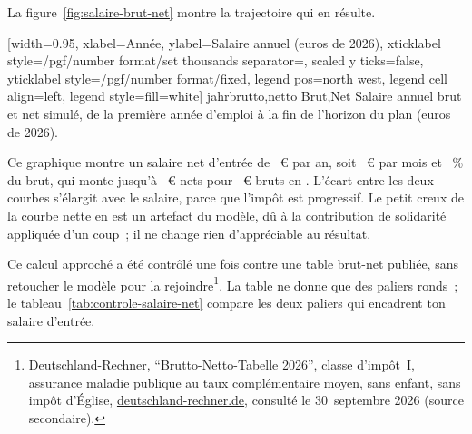 
La figure~\ref{fig:salaire-brut-net} montre la trajectoire qui en r\'esulte.

[width=0.95\linewidth, xlabel={Ann\'ee}, ylabel={Salaire annuel (euros de 2026)},
  xticklabel style={/pgf/number format/set thousands separator={}}, scaled y ticks=false,
  yticklabel style={/pgf/number format/fixed}, legend pos=north west, legend cell align=left, legend style={fill=white}]%
  {jahr}{brutto,netto}%
  {{Brut},{Net}}%
  {Salaire annuel brut et net simul\'e, de la premi\`ere ann\'ee d'emploi \`a la fin de l'horizon du
  plan (euros de 2026).\label{fig:salaire-brut-net}}

Ce graphique montre un salaire net d'entr\'ee de \GehaltNetEntree~€ par an, soit
\GehaltNetEntreeMois~€ par mois et \GehaltNetPart~\% du brut, qui monte jusqu'\`a \GehaltNetFin~€ nets
pour \GehaltBrutFin~€ bruts en \AnneeHorizonFin. L'\'ecart entre les deux courbes s'\'elargit avec le
salaire, parce que l'imp\^ot est progressif. Le petit creux de la courbe nette en \GehaltCreuxAnnee{}
est un artefact du mod\`ele, d\^u \`a la contribution de solidarit\'e appliqu\'ee d'un coup~; il ne
change rien d'appr\'eciable au r\'esultat.

Ce calcul approch\'e a \'et\'e contr\^ol\'e une fois contre une table brut-net publi\'ee, sans retoucher
le mod\`ele pour la rejoindre\footnote{Deutschland-Rechner, \enquote{Brutto-Netto-Tabelle 2026}, classe
d'imp\^ot~I, assurance maladie publique au taux compl\'ementaire moyen, sans enfant, sans imp\^ot
d'\'Eglise, \href{https://www.deutschland-rechner.de/brutto-netto-tabelle}{deutschland-rechner.de},
consult\'e le 30~septembre 2026 (source secondaire).}. La table ne donne que des paliers ronds~; le
tableau~\ref{tab:controle-salaire-net} compare les deux paliers qui encadrent ton salaire d'entr\'ee.

